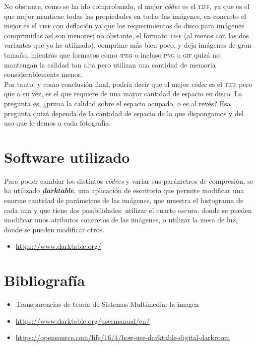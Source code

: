 \documentclass[11pt,a4paper]{article}
\begin{document}
No obstante, como se ha ido comprobando, el mejor \textit{códec} es el \textsc{tiff}, ya que es el que mejor mantiene todas las propiedades en todas las imágenes, en concreto el mejor es el \textsc{tiff} con deflación ya que los requerimientos de disco para imágenes comprimidas así son menores; no obstante, el formato \textsc{tiff} (al menos con las dos variantes que yo he utilizado), comprime más bien poco, y deja imágenes de gran tamaño, mientras que formatos como \textsc{jpeg} o incluso \textsc{png} o \textsc{gif} quizá no mantengan la calidad tan alta pero utilizan una cantidad de memoria considerablemente menor.\\

Por tanto, y como conclusión final, podría decir que el mejor \textit{códec} es el \textsc{tiff} pero que a su vez, es el que requiere de una mayor cantidad de espacio en disco. La pregunta es, ¿prima la calidad sobre el espacio ocupado, o es al revés? Esa pregunta quizá dependa de la cantidad de espacio de la que dispongamos y del uso que le demos a cada fotografía.

\newpage

\section{Software utilizado}

Para poder cambiar los distintos \textit{códecs} y variar sus parámetros de compresión, se ha utilizado \textbf{\textit{darktable}}, una aplicación de escritorio que permite modificar una enorme cantidad de parámetros de las imágenes, que muestra el histograma de cada una y que tiene dos posibilidades: utilizar el cuarto oscuro, donde se pueden modificar unos atributos concretos de las imágenes, o utilizar la mesa de luz, donde se pueden modificar otros.\\

\begin{itemize}
	\item \textcolor{blue}{\url{https://www.darktable.org/}}
\end{itemize}

\section{Bibliografía}

\begin{itemize}
	\item Transparencias de teoría de Sistemas Multimedia: la imagen
	\item \textcolor{blue}{\url{https://www.darktable.org/usermanual/en/}}
	\item \textcolor{blue}{\url{https://opensource.com/life/16/4/how-use-darktable-digital-darkroom}}
\end{itemize}
\end{document}
